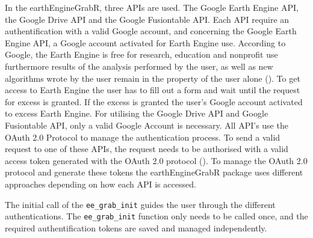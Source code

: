 In the earthEngineGrabR, three APIs are used. The Google Earth Engine API, the Google Drive API and the Google Fusiontable API. Each API require an authentification with a valid Google account, and concerning the Google Earth Engine API, a Google account activated for Earth Engine use. According to Google, the Earth Engine is free for research, education and nonprofit use furthermore results of the analysis performed by the user, as well as new algorithms wrote by the user remain in the property of the user alone (\cite{terms}).
To get access to Earth Engine the user has to fill out a form and wait until the request for excess is granted. If the excess is granted the user's Google account activated to excess Earth Engine. For utilising the Google Drive API and Google Fusiontable API, only a valid Google Account is necessary. All API's use the OAuth 2.0 Protocol to manage the authentication process. To send a valid request to one of these APIs, the request needs to be authorised with a valid access token generated with the OAuth 2.0 protocol (\cite{hardt2012oauth}). To manage the OAuth 2.0 protocol and generate these tokens the earthEngineGrabR package uses different approaches depending on how each API is accessed. 

The initial call of the \texttt{ee\_grab\_init} guides the user through the different authentications. The \texttt{ee\_grab\_init} function only needs to be called once, and the required authentification tokens are saved and managed independently. 



